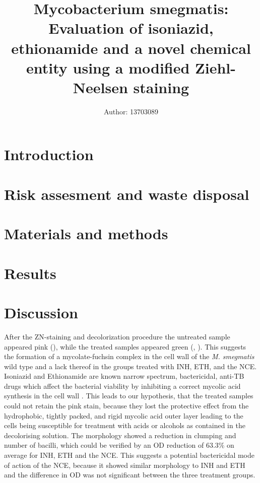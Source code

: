 \documentclass[11pt]{cls/labreport}
\title{\vspace*{2cm} Mycobacterium smegmatis: Evaluation of isoniazid, ethionamide and a novel chemical entity using a modified Ziehl-Neelsen staining}
\author[1]{Author: 13703089}
\affil[1]{BSc Biomedicine$^{\ast}$}
\begin{document}
\maketitle
\thispagestyle{firststyle}
\vspace{-13pt}%

\begin{multicols}{2}
\section{Introduction}
    \introduction
    
\section{Risk assesment and waste disposal}
    \riskassesment
    
\section{Materials and methods}
\label{sec:materials:methods}
    \materials

\section{Results}
    \results


\section{Discussion}
After the ZN-staining and decolorization procedure the untreated sample appeared pink (), while the treated samples appeared green (, ). This suggests the formation of a mycolate-fuchsin complex in the cell wall of the \textit{M. smegmatis} wild type and a lack thereof in the groups treated with INH, ETH, and the NCE. Isoniazid and Ethionamide are known narrow spectrum, bactericidal, anti-TB drugs which affect the bacterial viability by inhibiting a correct mycolic acid synthesis in the cell wall \cite{Banerjee1994,York2008}. This leads to our hypothesis, that the treated samples could not retain the pink stain, because they lost the protective effect from the hydrophobic, tightly packed, and rigid mycolic acid outer layer leading to the cells being susceptible for treatment with acids or alcohols as contained in the decolorising solution. The morphology showed a reduction in clumping and number of bacilli, which could be verified by an OD reduction of 63.3\% on average for INH, ETH and the NCE.  This suggests a potential bactericidal mode of action of the NCE, because it showed similar morphology to INH and ETH and the difference in OD was not significant between the three treatment groups.


\end{multicols}
\end{document}

